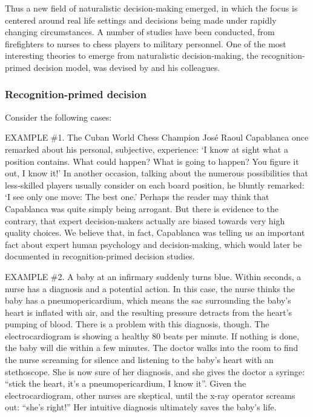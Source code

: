 Thus a new field of naturalistic decision-making emerged, in which the focus is centered around real life settings and decisions being made under rapidly changing circumstances.  A number of studies have been conducted, from firefighters to nurses to chess players to military personnel.  One of the most interesting theories to emerge from naturalistic decision-making, the recognition-primed decision model, was devised by \citet{klein1999sources} and his colleagues.

\subsubsection{Recognition-primed decision}

Consider the following cases:

EXAMPLE \#1. The Cuban World Chess Champion José Raoul Capablanca once remarked about his personal, subjective, experience: `I know at sight what a position contains. What could happen? What is going to happen? You figure it out, I know it!' In another occasion, talking about the numerous possibilities that less-skilled players usually consider on each board position, he bluntly remarked: `I see only one move: The best one.'  Perhaps the reader may think that Capablanca was quite simply being arrogant.  But there is evidence to the contrary, that expert decision-makers actually are biased towards very high quality choices.  We believe that, in fact, Capablanca was telling us an important fact about expert human psychology and decision-making, which would later be documented in recognition-primed decision studies.

EXAMPLE \#2. A baby at an infirmary suddenly turns blue.  Within seconds, a nurse has a diagnosis and a potential action.  In this case, the nurse thinks the baby has a pneumopericardium, which means the sac surrounding the baby's heart is inflated with air, and the resulting pressure detracts from the heart's pumping of blood.  There is a problem with this diagnosis, though.  The electrocardiogram is showing a healthy 80 beats per minute.  If nothing is done, the baby will die within a few minutes.  The doctor walks into the room to find the nurse screaming for silence and listening to the baby's heart with an stethoscope.  She is now sure of her diagnosis, and she gives the doctor a syringe: ``stick the heart, it's a pneumopericardium, I know it''.  Given the electrocardiogram, other nurses are skeptical, until the x-ray operator screams out: ``she's right!''  Her intuitive diagnosis ultimately saves the baby's life.

